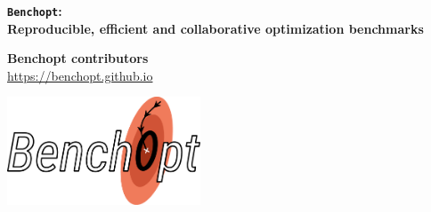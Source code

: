 \documentclass[unknownkeysallowed]{beamer}
\begin{document}


\begin{frame}
\bigskip
\bigskip
\begin{center}{
\LARGE\color{marron}
\textbf{\texttt{Benchopt}:\\
Reproducible, efficient and collaborative optimization benchmarks}
\textbf{ }\\
}

\color{marron}
\end{center}

\vspace{0.5cm}

\begin{center}
\textbf{Benchopt contributors} \\
\vspace{0.1cm}
\url{https://benchopt.github.io}\\
\end{center}

\centering
\includegraphics[width=0.43\textwidth]{../sharedimages/benchopt_logo.pdf}

\end{frame}
\end{document}
